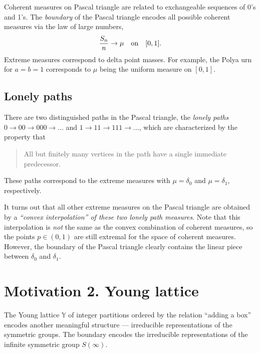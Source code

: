 \documentclass[letterpaper,11pt,oneside,reqno]{article}
\numberwithin{equation}{section}
\theoremstyle{definition}
\begin{document}
Coherent measures on Pascal triangle are related to exchangeable
sequences of 0's and 1's. The \emph{boundary} of the Pascal
triangle encodes all possible coherent measures via the law of large numbers,
\begin{equation*}
	\frac{S_n}{n}\to \mu \quad \textnormal{on} \quad [0,1].
\end{equation*}
Extreme measures correspond to delta point masses.
For example, the Polya urn for $a=b=1$ corresponds to $\mu$ being the
uniform measure on $[0,1]$.

\subsection{Lonely paths}

There are two distinguished paths in the Pascal triangle, the
\emph{lonely paths} $0\to00\to000\to\ldots $
and
$1\to 11\to111\to\ldots $, which are characterized by the
property that \cite{KerovGoodman1997}
\begin{quote}
	All but finitely many vertices in the path have a single immediate predecessor.
\end{quote}
These paths correspond to the extreme measures
with $\mu=\delta_0$ and $\mu=\delta_1$, respectively.

It turns out that all other extreme measures on the Pascal triangle
are obtained by a \emph{``convex interpolation'' of these two lonely path measures}.
Note that this interpolation is \emph{not} the same as the convex combination
of coherent measures, so the points $p\in(0,1)$ are still extremal
for the space of coherent measures. However, the boundary
of the Pascal triangle clearly contains the linear
piece between $\delta_0$ and $\delta_1$.


\section{Motivation 2. Young lattice}

The Young lattice $\mathbb{Y}$ of integer partitions ordered
by the relation ``adding a box''
encodes another meaningful structure --- irreducible representations of the symmetric groups.
The boundary encodes the irreducible representations of the infinite symmetric group $S(\infty)$.
\end{document}
